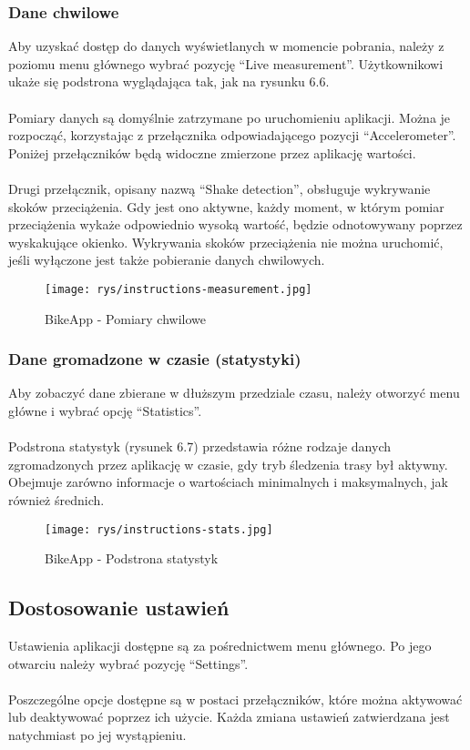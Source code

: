 \subsubsection{Dane chwilowe} %
Aby uzyskać dostęp do danych wyświetlanych w momencie pobrania, należy z poziomu menu głównego wybrać pozycję ``Live measurement''. Użytkownikowi ukaże się podstrona wyglądająca tak, jak na rysunku 6.6.\\
\\
Pomiary danych są domyślnie zatrzymane po uruchomieniu aplikacji. Można je rozpocząć, korzystając z przełącznika odpowiadającego pozycji ``Accelerometer''. Poniżej przełączników będą widoczne zmierzone przez aplikację wartości.\\
\\
Drugi przełącznik, opisany nazwą ``Shake detection'', obsługuje wykrywanie skoków przeciążenia. Gdy jest ono aktywne, każdy moment, w którym pomiar przeciążenia wykaże odpowiednio wysoką wartość, będzie odnotowywany poprzez wyskakujące okienko. Wykrywania skoków przeciążenia nie można uruchomić, jeśli wyłączone jest także pobieranie danych chwilowych.

\begin{figure}[!htb]
	\begin{center}
		\texttt{[image: rys/instructions-measurement.jpg]}
		\caption{BikeApp - Pomiary chwilowe}
		\label{rys:BikeApp - Pomiary chwilowe}
	\end{center}
\end{figure}

\subsubsection{Dane gromadzone w czasie (statystyki)} %
Aby zobaczyć dane zbierane w dłuższym przedziale czasu, należy otworzyć menu główne i wybrać opcję ``Statistics''.\\
\\
Podstrona statystyk (rysunek 6.7) przedstawia różne rodzaje danych zgromadzonych przez aplikację w czasie, gdy tryb śledzenia trasy był aktywny. Obejmuje zarówno informacje o wartościach minimalnych i maksymalnych, jak również średnich.

\begin{figure}[!htb]
	\begin{center}
		\texttt{[image: rys/instructions-stats.jpg]}
		\caption{BikeApp - Podstrona statystyk}
		\label{rys:BikeApp - Podstrona statystyk}
	\end{center}
\end{figure}

\subsection{Dostosowanie ustawień} %
Ustawienia aplikacji dostępne są za pośrednictwem menu głównego. Po jego otwarciu należy wybrać pozycję ``Settings''.\\
\\
Poszczególne opcje dostępne są w postaci przełączników, które można aktywować lub deaktywować poprzez ich użycie. Każda zmiana ustawień zatwierdzana jest natychmiast po jej wystąpieniu.


